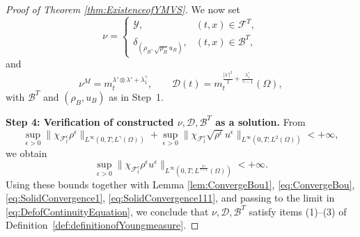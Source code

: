 \documentclass[11pt,twoside,reqno]{amsart}
\numberwithin{equation}{section}
\numberwithin{figure}{section}
\begin{document}
\begin{proof}[Proof of Theorem \ref{thm:ExistenceofYMVS}]

We now set
\[
    \nu=\begin{cases}
        \mathcal{Y},& (t,x)\in\mathcal{F}^T,\\
        \delta_{(\rho_B,\sqrt{\rho_B}u_B)},& (t,x)\in \mathcal{B}^T,
    \end{cases}
\]
and 
\begin{equation}\label{eq:Defmeasuers}
   \nu^M= m^{\lambda'\otimes\lambda'+\lambda_1^\gamma}_t,\qquad 
  \mathcal{D}(t)=m^{\frac{|\lambda'|^2}{2}+\frac{\lambda_1^\gamma}{\gamma-1}}_t(\Omega),
\end{equation}
with $\mathcal{B}^T$ and $(\rho_B, u_B)$ as in Step~1. 


\smallskip
\textbf{Step 4: Verification of constructed $\nu, \mathcal{D}, \mathcal{B}^T$ as a solution.} 
From 
\[
\sup_{\epsilon>0}\|\chi_{\mathcal{F}^\epsilon_t}\rho^\epsilon\|_{L^\infty(0,T;L^{\gamma}(\Omega))}
+\sup_{\epsilon>0}\|\chi_{\mathcal{F}^\epsilon_t}\sqrt{\rho^\epsilon}u^\epsilon\|_{L^\infty(0,T;L^{2}(\Omega))}<+\infty,
\]
we obtain 
\[
\sup_{\epsilon>0}\|\chi_{\mathcal{F}^\epsilon_t}\rho^\epsilon u^\epsilon\|_{L^\infty(0,T;L^{\frac{2\gamma}{\gamma+1}}(\Omega))}<+\infty.
\]
Using these bounds together with Lemma \ref{lem:ConvergeBou1}, \eqref{eq:ConvergeBou}, \eqref{eq:SolidConvergence1}, \eqref{eq:SolidConvergence111}, and passing to the limit in \eqref{eq:DefofContinuityEquation}, we conclude that $\nu,\mathcal{D},\mathcal{B}^T$ satisfy items (1)–(3) of Definition~\ref{def:definitionofYoungmeasure}. 


\end{proof}
\end{document}
